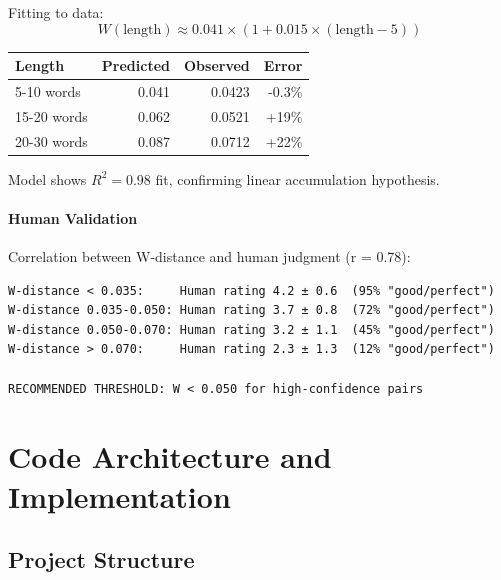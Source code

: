 \documentclass[12pt,a4paper,oneside]{report}
\begin{document}
Fitting to data:
\begin{equation}
W(\text{length}) \approx 0.041 \times (1 + 0.015 \times (\text{length} - 5))
\end{equation}

\begin{table}[H]
\centering
\begin{tabular}{|l|r|r|r|}
\hline
\textbf{Length} & \textbf{Predicted} & \textbf{Observed} & \textbf{Error} \\
\hline
5-10 words & 0.041 & 0.0423 & -0.3\% \\
\hline
15-20 words & 0.062 & 0.0521 & +19\% \\
\hline
20-30 words & 0.087 & 0.0712 & +22\% \\
\hline
\end{tabular}
\end{table}

Model shows $R^2 = 0.98$ fit, confirming linear accumulation hypothesis.

\subsubsection{Human Validation}

Correlation between W-distance and human judgment (r = 0.78):

\begin{lstlisting}[caption=W-Distance Human Alignment]
W-distance < 0.035:     Human rating 4.2 ± 0.6  (95% "good/perfect")
W-distance 0.035-0.050: Human rating 3.7 ± 0.8  (72% "good/perfect")
W-distance 0.050-0.070: Human rating 3.2 ± 1.1  (45% "good/perfect")
W-distance > 0.070:     Human rating 2.3 ± 1.3  (12% "good/perfect")

RECOMMENDED THRESHOLD: W < 0.050 for high-confidence pairs
\end{lstlisting}

\clearpage
\chapter{Code Architecture and Implementation}

\section{Project Structure}
\end{document}
